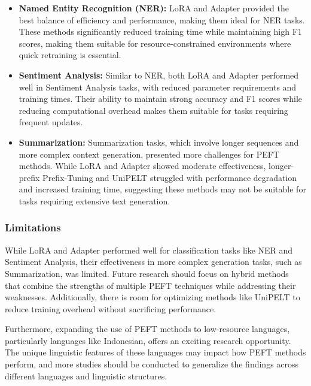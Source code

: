 \begin{itemize}
    \item \textbf{Named Entity Recognition (NER):} LoRA and Adapter provided the best balance of efficiency and performance, making them ideal for NER tasks. These methods significantly reduced training time while maintaining high F1 scores, making them suitable for resource-constrained environments where quick retraining is essential.
    \item \textbf{Sentiment Analysis:} Similar to NER, both LoRA and Adapter performed well in Sentiment Analysis tasks, with reduced parameter requirements and training times. Their ability to maintain strong accuracy and F1 scores while reducing computational overhead makes them suitable for tasks requiring frequent updates.
    \item \textbf{Summarization:} Summarization tasks, which involve longer sequences and more complex context generation, presented more challenges for PEFT methods. While LoRA and Adapter showed moderate effectiveness, longer-prefix Prefix-Tuning and UniPELT struggled with performance degradation and increased training time, suggesting these methods may not be suitable for tasks requiring extensive text generation.
\end{itemize}

\subsubsection{\textbf{Limitations}}
While LoRA and Adapter performed well for classification tasks like NER and Sentiment Analysis, their effectiveness in more complex generation tasks, such as Summarization, was limited. Future research should focus on hybrid methods that combine the strengths of multiple PEFT techniques while addressing their weaknesses. Additionally, there is room for optimizing methods like UniPELT to reduce training overhead without sacrificing performance.

Furthermore, expanding the use of PEFT methods to low-resource languages, particularly languages like Indonesian, offers an exciting research opportunity. The unique linguistic features of these languages may impact how PEFT methods perform, and more studies should be conducted to generalize the findings across different languages and linguistic structures.

